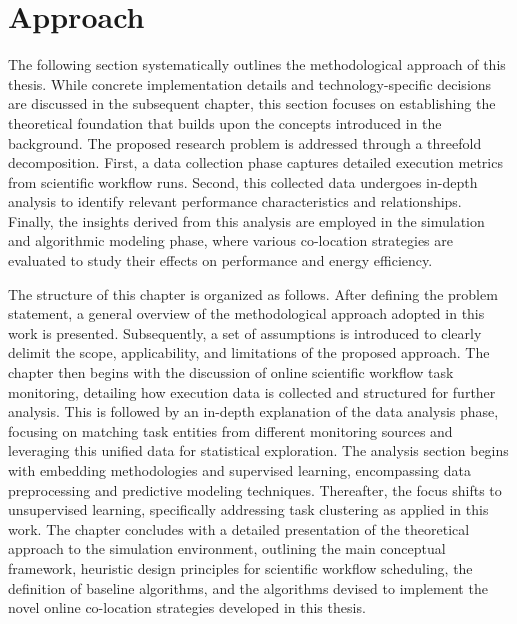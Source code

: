 \section{Approach}
\label{cha:approach}
The following section systematically outlines the methodological approach of this thesis. While concrete implementation details and technology-specific decisions are discussed in the subsequent chapter, this section focuses on establishing the theoretical foundation that builds upon the concepts introduced in the background. The proposed research problem is addressed through a threefold decomposition. First, a data collection phase captures detailed execution metrics from scientific workflow runs. Second, this collected data undergoes in-depth analysis to identify relevant performance characteristics and relationships. Finally, the insights derived from this analysis are employed in the simulation and algorithmic modeling phase, where various co-location strategies are evaluated to study their effects on performance and energy efficiency.

The structure of this chapter is organized as follows. After defining the problem statement, a general overview of the methodological approach adopted in this work is presented. Subsequently, a set of assumptions is introduced to clearly delimit the scope, applicability, and limitations of the proposed approach. The chapter then begins with the discussion of online scientific workflow task monitoring, detailing how execution data is collected and structured for further analysis. This is followed by an in-depth explanation of the data analysis phase, focusing on matching task entities from different monitoring sources and leveraging this unified data for statistical exploration. The analysis section begins with embedding methodologies and supervised learning, encompassing data preprocessing and predictive modeling techniques. Thereafter, the focus shifts to unsupervised learning, specifically addressing task clustering as applied in this work. The chapter concludes with a detailed presentation of the theoretical approach to the simulation environment, outlining the main conceptual framework, heuristic design principles for scientific workflow scheduling, the definition of baseline algorithms, and the algorithms devised to implement the novel online co-location strategies developed in this thesis.


